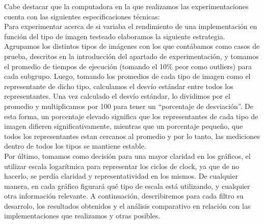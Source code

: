 
Cabe destacar que la computadora en la que realizamos las experimentaciones cuenta con las siguientes especificaciones técnicas:\\

Para experimentar acerca de si variaba el rendimiento de una implementación en función del tipo de imagen testeado elaboramos la siguiente estrategia. Agrupamos los distintos tipos de imágenes con los que contábamos como casos de prueba, descritos en la introducción del apartado de experimentación, y tomamos el promedio de tiempos de ejecución (tomando el 10\% peor como outliers) para cada subgrupo. Luego, tomando los promedios de cada tipo de imagen como el representante de dicho tipo, calculamos el desvío estándar entre todos los representantes. Una vez calculado el desvío estándar, lo dividimos por el promedio y multiplicamos por 100 para tener un “porcentaje de desviación”. De esta forma, un porcentaje elevado significa que los representantes de cada tipo de imagen difieren significativamente, mientras que un porcentaje pequeño, que todos los representantes estan cercanos al promedio y por lo tanto, las mediciones dentro de todos los tipos se mantiene estable.\\

Por último, tomamos como decisión para una mayor claridad en los gráficos, el utilizar escala logarítmica para representar los ciclos de clock, ya que de no hacerlo, se perdía claridad y representatividad en los mismos. De cualquier manera, en cada gráfico figurará qué tipo de escala está utilizando, y cualquier otra información relevante.
A continuación, describiremos para cada filtro su desarrolo, los resultados obtenidos y el análisis comparativo en relación con las implementaciones que realizamos y otras posibles.\\\\\\\\\\\\\\\\\\

